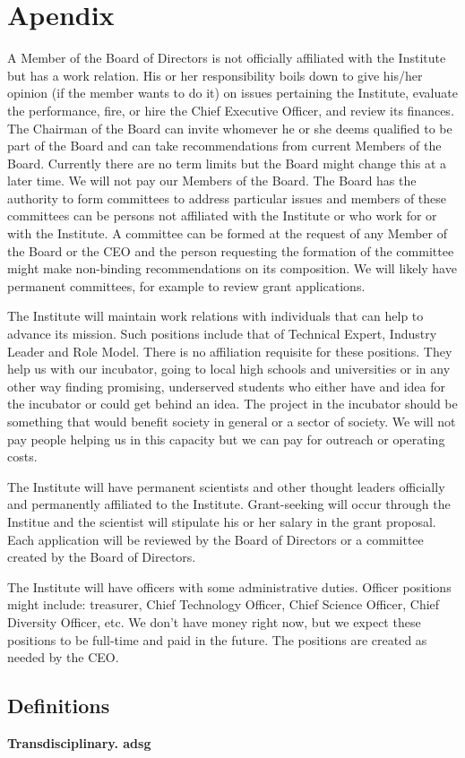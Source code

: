 \section{Apendix}

A Member of the Board of Directors is not officially affiliated with the Institute but has a work relation. His or her responsibility boils down to give his/her opinion (if the member wants to do it) on issues pertaining the Institute, evaluate the performance, fire, or hire the Chief Executive Officer, and review its finances. The Chairman of the Board can invite whomever he or she deems qualified to be part of the Board and can take recommendations from current Members of the Board. Currently there are no term limits but the Board might change this at a later time. We will not pay our Members of the Board. The Board has the authority to form committees to address particular issues and members of these committees can be persons not affiliated with the Institute or who work for or with the Institute. A committee can be formed at the request of any Member of the Board or the CEO and the person requesting the formation of the committee might make non-binding recommendations on its composition. We will likely have permanent committees, for example to review grant applications.

The Institute will maintain work relations with individuals that can help to advance its mission. Such positions include that of Technical Expert, Industry Leader and Role Model. There is no affiliation requisite for these positions. They help us with our incubator, going to local high schools and universities or in any other way finding promising, underserved students who either have and idea for the incubator or could get behind an idea. The project in the incubator should be something that would benefit society in general or a sector of society. We will not pay people helping us in this capacity but we can pay for outreach or operating costs.

The Institute will have permanent scientists and other thought leaders officially and permanently affiliated to the Institute. Grant-seeking will occur through the Institue and the scientist will stipulate his or her salary in the grant proposal. Each application will be reviewed by the Board of Directors or a committee created by the Board of Directors.

The Institute will have officers with some administrative duties. Officer positions might include: treasurer, Chief Technology Officer, Chief Science Officer, Chief Diversity Officer, etc. We don't have money right now, but we expect these positions to be full-time and paid in the future. The positions are created as needed by the CEO. 

\subsection{Definitions}

\bf{Transdisciplinary.} adsg